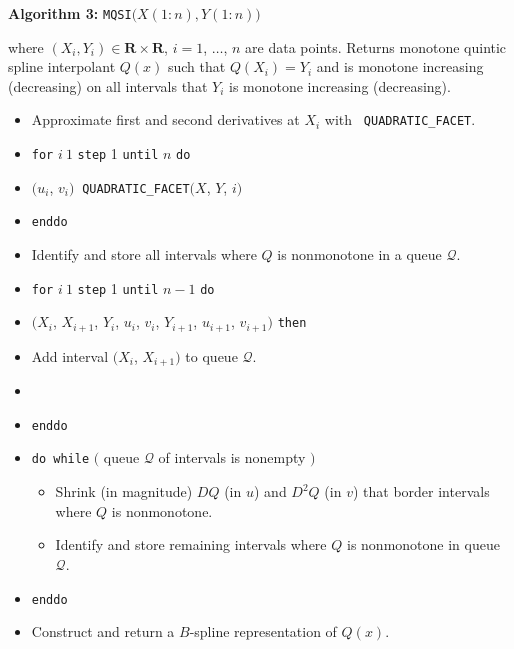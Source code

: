 \vskip 3mm
{\parindent 0mm
{\bf Algorithm 3:}
{\tt MQSI}$\bigl(X(1{:}n), Y(1{:}n) \bigr)$

\nobreak
where $(X_i,Y_i) \in \mathbf{R}\times\mathbf{R}$, $i = 1$, $\ldots$, $n$ are data
points. Returns monotone quintic spline interpolant $Q(x)$ such that
$Q(X_i) = Y_i$ and is monotone increasing (decreasing) on all
intervals that $Y_i$ is monotone increasing (decreasing).

}
{\parindent=6mm
\begin{itemize}
\item[]{ Approximate first and second derivatives at $X_i$ with {\tt
  QUADRATIC\_FACET}.}
\item[]{ {\tt for} $i\:1$ {\tt step} 1 {\tt until} $n$ {\tt do}}
\item[]{ \codent $(u_i$, $v_i)\:$ {\tt QUADRATIC\_FACET}$(X$, $Y$, $i)$}
\item[]{ {\tt enddo}}
\item[]{ Identify and store all intervals where $Q$ is nonmonotone in a
queue $\mathcal{Q}$.}
\item[]{ {\tt for} $i\:1$ {\tt step} 1 {\tt until} $n-1$ {\tt do}}
\item[]{ $(X_i$, $X_{i+1}$, $Y_i$, $u_i$,
$v_i$, $Y_{i+1}$, $u_{i+1}$, $v_{i+1})$ {\tt then}}
\item[]{ \codent\codent Add interval $\bigl(X_i$, $X_{i+1}\bigr)$ to
queue $\mathcal{Q}$.}
\item[]{ }
\item[]{ {\tt enddo}}
\item[]{ {\tt do while} $\bigl($ queue $\mathcal{Q}$ of intervals is nonempty $\bigr)$}
\begin{itemize}
\item[]{ Shrink (in magnitude) $DQ$ (in $u$) and $D^2Q$ (in $v$)
  that border intervals where $Q$ is nonmonotone.  }
\item[]{ Identify and store remaining intervals where $Q$ is
  nonmonotone in queue $\mathcal{Q}$.}
\end{itemize}
\item[]{ {\tt enddo}}
\item[]{ Construct and return a $B$-spline representation of $Q(x)$.}
\end{itemize}
}
\vskip 3mm


